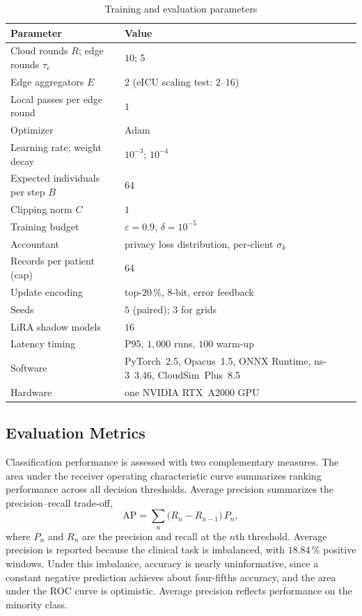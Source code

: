 \begin{table}[!t]
\centering
\caption{Training and evaluation parameters}
\label{tab:params}
\footnotesize
\setlength{\tabcolsep}{4pt}
\begin{tabular}{@{}p{}p{}@{}}
\toprule
Parameter & Value \\
\midrule
Cloud rounds $R$; edge rounds $\tau_e$ & $10$; $5$ \\
Edge aggregators $E$ & $2$ (eICU scaling test: $2$--$16$) \\
Local passes per edge round & $1$ \\
Optimizer & Adam \\
Learning rate; weight decay & $10^{-3}$; $10^{-4}$ \\
Expected individuals per step $B$ & $64$ \\
Clipping norm $C$ & $1$ \\
Training budget & $\varepsilon = 0.9$, $\delta = 10^{-5}$ \\
Accountant & privacy loss distribution, per-client $\sigma_k$ \\
Records per patient (cap) & $64$ \\
Update encoding & top-$20\,\%$, $8$-bit, error feedback \\
Seeds & $5$ (paired); $3$ for grids \\
LiRA shadow models & $16$ \\
Latency timing & P95, $1{,}000$ runs, $100$ warm-up \\
Software & PyTorch~2.5, Opacus~1.5, ONNX Runtime, ns-3~3.46, CloudSim~Plus~8.5 \\
Hardware & one NVIDIA RTX~A2000 GPU \\
\bottomrule
\end{tabular}
\end{table}

\subsection{Evaluation Metrics}

Classification performance is assessed with two complementary measures. The
area under the receiver operating characteristic curve summarizes ranking
performance across all decision thresholds. Average precision summarizes the
precision--recall trade-off,
%
\begin{equation}
\mathrm{AP} = \sum_{n} \big(R_n - R_{n-1}\big)\, P_n,
\tag{14}
\label{eq:16}
\end{equation}
%
where $P_n$ and $R_n$ are the precision and recall at the $n$th threshold.
Average precision is reported because the clinical task is imbalanced, with
$18.84\,\%$ positive windows. Under this imbalance, accuracy is nearly
uninformative, since a constant negative prediction achieves about four-fifths
accuracy, and the area under the ROC curve is optimistic. Average precision
reflects performance on the minority class.

